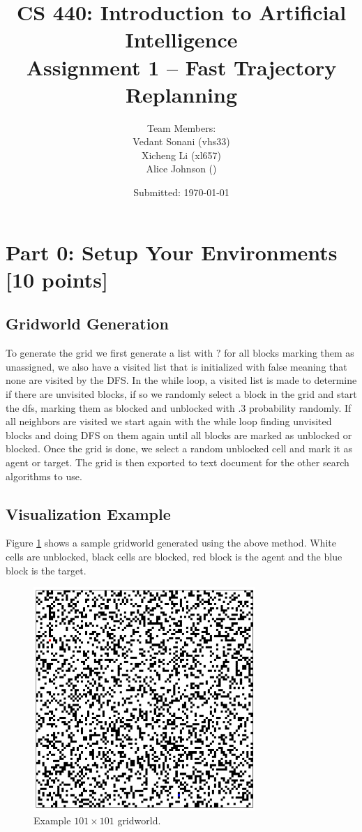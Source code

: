 \documentclass[12pt]{article}
\title{CS 440: Introduction to Artificial Intelligence \\ Assignment 1 -- Fast Trajectory Replanning}
\author{Team Members: \\ 
Vedant Sonani (vhs33) \\ 
Xicheng Li (xl657) \\ 
Alice Johnson (\ruid)}
\date{Submitted: \today}
\begin{document}
\maketitle

\section*{Part 0: Setup Your Environments [10 points]}
\label{sec:part0}

\subsection*{Gridworld Generation}
To generate the grid we first generate a list with $?$ for all blocks marking them as unassigned, we also have a visited list that is initialized with false meaning that none are visited by the DFS. In the while loop, a visited list is made to determine if there are unvisited blocks, if so we randomly select a block in the grid and start the dfs, marking them as blocked and unblocked with .3 probability randomly. If all neighbors are visited we start again with the while loop finding unvisited blocks and doing DFS on them again until all blocks are marked as unblocked or blocked. Once the grid is done, we select a random unblocked cell and mark it as agent or target. The grid is then exported to text document for the other search algorithms to use.

\subsection*{Visualization Example}
Figure \ref{fig:gridworld} shows a sample gridworld generated using the above method. White cells are unblocked, black cells are blocked, red block is the agent and the blue block is the target.

\begin{figure}[ht]
    \centering
    \includegraphics[width=0.75\textwidth]{Figure_1.png}
    \caption{Example \(101 \times 101\) gridworld.}
    \label{fig:gridworld}
\end{figure}
\end{document}
